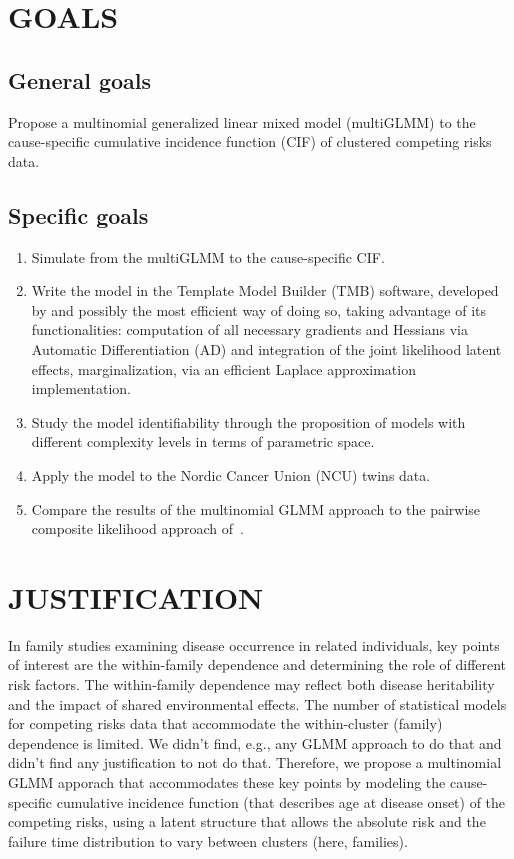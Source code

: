 \section{GOALS}

\subsection{General goals}

Propose a multinomial generalized linear mixed model (multiGLMM) to the
cause-specific cumulative incidence function (CIF) of clustered
competing risks data.

\subsection{Specific goals}

\begin{enumerate}
\item Simulate from the multiGLMM to the cause-specific CIF.

\item Write the model in the Template Model Builder (TMB) software,
  developed by  and possibly the most efficient way of
  doing so, taking advantage of its functionalities: computation of all
  necessary gradients and Hessians via Automatic Differentiation (AD)
  and integration of the joint likelihood latent effects,
  marginalization, via an efficient Laplace approximation
  implementation.

\item Study the model identifiability through the proposition of models
  with different complexity levels in terms of parametric space.

\item Apply the model to the Nordic Cancer Union (NCU) twins data.

\item Compare the results of the multinomial GLMM approach to the
  pairwise composite likelihood approach of~.
\end{enumerate}

\section{JUSTIFICATION}

In family studies examining disease occurrence in related individuals,
key points of interest are the within-family dependence and determining
the role of different risk factors. The within-family dependence may
reflect both disease heritability and the impact of shared environmental
effects. The number of statistical models for competing risks data that
accommodate the within-cluster (family) dependence is limited. We didn't
find, e.g., any GLMM approach to do that and didn't find any
justification to not do that. Therefore, we propose a multinomial GLMM
apporach that accommodates these key points by modeling the
cause-specific cumulative incidence function (that describes age at
disease onset) of the competing risks, using a latent structure that
allows the absolute risk and the failure time distribution to vary
between clusters (here, families).

